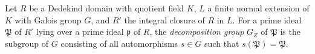 Let $R$ be a Dedekind domain with quotient field $K$, $L$ a finite normal extension of $K$ with Galois group $G$, and $R'$ the integral closure of $R$ in $L$. For a prime ideal $\mathfrak{P}$ of $R'$ lying over a prime ideal $\mathfrak{p}$ of $R$, the \textit{decomposition group} $G_Z$ of $\mathfrak{P}$ is the subgroup of $G$ consisting of all automorphisms $s \in G$ such that $s(\mathfrak{P}) = \mathfrak{P}$.
